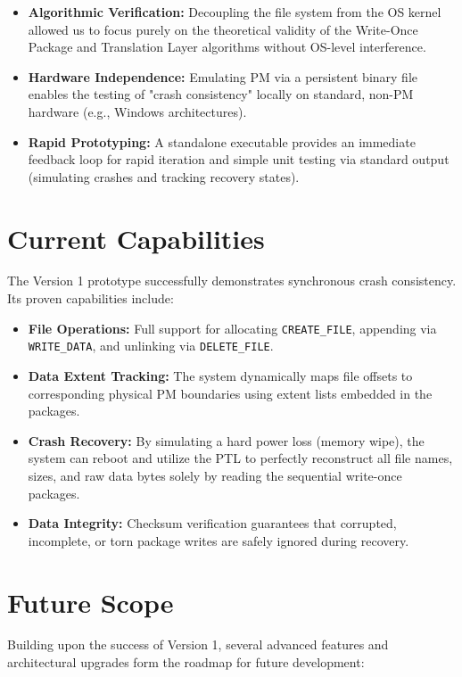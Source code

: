 \documentclass[conference]{IEEEtran}
\begin{document}
\begin{itemize}
    \item \textbf{Algorithmic Verification:} Decoupling the file system from the OS kernel allowed us to focus purely on the theoretical validity of the Write-Once Package and Translation Layer algorithms without OS-level interference.
    \item \textbf{Hardware Independence:} Emulating PM via a persistent binary file enables the testing of "crash consistency" locally on standard, non-PM hardware (e.g., Windows architectures).
    \item \textbf{Rapid Prototyping:} A standalone executable provides an immediate feedback loop for rapid iteration and simple unit testing via standard output (simulating crashes and tracking recovery states).
\end{itemize}

\section{Current Capabilities}
The Version 1 prototype successfully demonstrates synchronous crash consistency. Its proven capabilities include:
\begin{itemize}
    \item \textbf{File Operations:} Full support for allocating \texttt{CREATE\_FILE}, appending via \texttt{WRITE\_DATA}, and unlinking via \texttt{DELETE\_FILE}.
    \item \textbf{Data Extent Tracking:} The system dynamically maps file offsets to corresponding physical PM boundaries using extent lists embedded in the packages.
    \item \textbf{Crash Recovery:} By simulating a hard power loss (memory wipe), the system can reboot and utilize the PTL to perfectly reconstruct all file names, sizes, and raw data bytes solely by reading the sequential write-once packages.
    \item \textbf{Data Integrity:} Checksum verification guarantees that corrupted, incomplete, or torn package writes are safely ignored during recovery.
\end{itemize}

\section{Future Scope}
Building upon the success of Version 1, several advanced features and architectural upgrades form the roadmap for future development:
\end{document}
